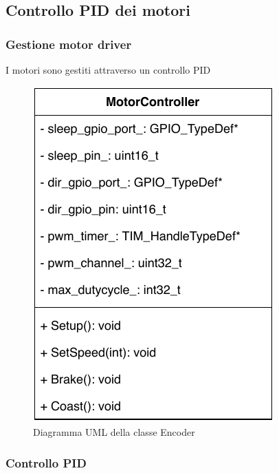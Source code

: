 \subsection{Controllo PID dei motori}

\subsubsection{Gestione motor driver}
I motori sono gestiti attraverso un controllo PID

\begin{figure}[htb]
    \centering
    \includegraphics[scale=0.80]{images/motorcontroller_class.pdf}
    \caption{Diagramma UML della classe Encoder}
    \label{fig:motorcontroller_class}
\end{figure}


\subsubsection{Controllo PID}

